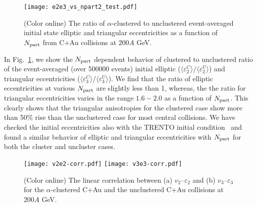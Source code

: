 \documentclass[aps,prc,twocolumn,floatfix,12pts,superscriptaddress]{revtex4}
\begin{document}
\begin{figure}[tb]
	\centering
	{\texttt{[image: e2e3\_vs\_npart2\_test.pdf]}}
	\vspace{-3mm}
	\caption {(Color online) The ratio of $\alpha$-clustered to unclustered event-averaged initial state elliptic and triangular eccentricities as a function of $N_{\rm part}$ from  C+Au collisions at $200A$ GeV. }
	\label{fig1}
\end{figure}

 In Fig.~\ref{fig1}, we show the $ N_{\rm part}$ dependent behavior of clustered to unclustered ratio of the event-averaged (over 500000 events) initial elliptic  ($ \langle \varepsilon_2^C\rangle/\langle \varepsilon_2^U\rangle$)  and triangular eccentricities ($ \langle \varepsilon_3^C\rangle/\langle \varepsilon_3^U\rangle$). We find that the ratio of elliptic eccentricities at various $ N_{\rm part}$ are slightly less than 1, whereas,  the  the ratio for triangular eccentricities varies in the range $1.6-2.0$ as a function of $N_{\rm part}$.  This clearly shows that the triangular anisotropies for the clustered case show more than 50\% rise than the unclustered case for most central collisions. {We have checked the initial eccentricities also with the TRENTO initial condition~\cite{Moreland:2014oya} and found a similar behavior of elliptic and triangular eccentricities with $N_{\rm part}$ for both the cluster and uncluster cases.} \\

\begin{figure}[htbp!]
	\centering
	{\texttt{[image: v2e2-corr.pdf]}}
	{\texttt{[image: v3e3-corr.pdf]}}
	\vspace{-3mm}
	\caption {(Color online)  The linear correlation between  (a)  $v_2$--$\varepsilon_2$ and (b)  $v_3$--$\varepsilon_3$  for  the $\alpha$-clustered C+Au and the unclustered C+Au collisions at $200A$ GeV. }
	\label{fig2}
\end{figure} 
\end{document}
